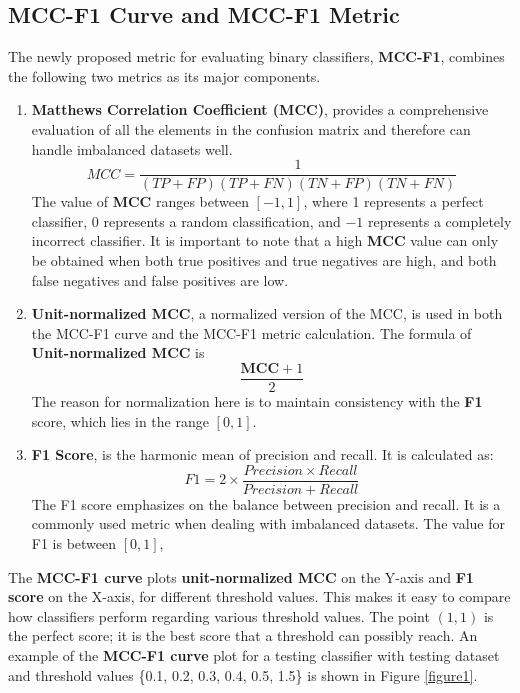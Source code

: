 \documentclass[12pt, oneside]{amsart}
\theoremstyle{definition}
\theoremstyle{remark}
\numberwithin{equation}{section}
\begin{document}
\subsection{MCC-F1 Curve and MCC-F1 Metric}
The newly proposed metric for evaluating binary classifiers, \textbf{MCC-F1}, combines the following two metrics as its major components.
\begin{enumerate}
    \item \textbf{Matthews Correlation Coefficient (MCC)}, provides a comprehensive evaluation of all the elements in the confusion matrix and therefore can handle imbalanced datasets well. $$ MCC=\frac{1}{(TP+FP)(TP+FN)(TN+FP)(TN+FN)}$$
    The value of \textbf{MCC} ranges between $[-1,1]$, where 1 represents a perfect classifier, 0 represents a random classification, and $-1$ represents a completely incorrect classifier. It is important to note that a high \textbf{MCC} value can only be obtained when both true positives and true negatives are high, and both false negatives and false positives are low. 
    \item \textbf{Unit-normalized MCC}, a normalized version of the MCC, is used in both the MCC-F1 curve and the MCC-F1 metric calculation. The formula of \textbf{Unit-normalized MCC} is $$\frac{\textbf{MCC} + 1}{2}$$ The reason for normalization here is to maintain consistency with the \textbf{F1} score, which lies in the range $[0,1]$. 
    \item \textbf{F1 Score}, is the harmonic mean of precision and recall. It is calculated as:
    $$F1=2 \times \frac{Precision \times Recall}{Precision+Recall} $$ The F1 score emphasizes on the balance between precision and recall. It is a commonly used metric when dealing with imbalanced datasets. The value for F1 is between $[0,1]$,
\end{enumerate}

The \textbf{MCC-F1 curve} plots \textbf{unit-normalized MCC} on the Y-axis and \textbf{F1 score} on the X-axis, for different threshold values. This makes it easy to compare how classifiers perform regarding various threshold values. The point $(1,1)$  is the perfect score; it is the best score that a threshold can possibly reach. An example of the \textbf{MCC-F1 curve} plot for a testing classifier with testing dataset and threshold values \{0.1, 0.2, 0.3, 0.4, 0.5, 1.5\} is shown in Figure \ref{figure1}.
\end{document}
